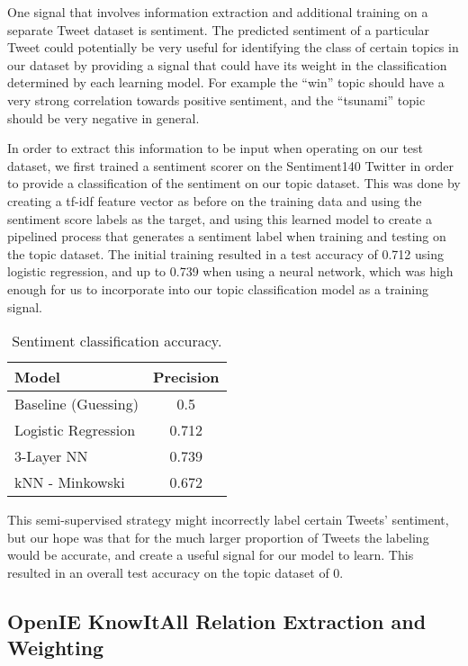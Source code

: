 \documentclass[11pt]{article}
\begin{document}
One signal that involves information extraction and additional training on a separate Tweet dataset is sentiment. The predicted sentiment of a particular Tweet could potentially be very useful for identifying the class of certain topics in our dataset by providing a signal that could have its weight in the classification determined by each learning model. For example the “win” topic should have a very strong correlation towards positive sentiment, and the “tsunami” topic should be very negative in general.

In order to extract this information to be input when operating on our test dataset, we first trained a sentiment scorer on the Sentiment140 Twitter in order to provide a classification of the sentiment on our topic dataset. This was done by creating a tf-idf feature vector as before on the training data and using the sentiment score labels as the target, and using this learned model to create a pipelined process that generates a sentiment label when training and testing on the topic dataset. The initial training resulted in a test accuracy of 0.712 using logistic regression, and up to 0.739 when using a neural network, which was high enough for us to incorporate into our topic classification model as a training signal.

\begin{table}[h]
\begin{center}
\begin{tabular}{|l|c|}
\hline \bf Model & \bf Precision \\ \hline
Baseline (Guessing) & 0.5 \\
Logistic Regression & 0.712 \\
3-Layer NN & 0.739 \\
kNN - Minkowski & 0.672 \\
\hline
\end{tabular}
\end{center}
\label{table:sentiment}
\caption{Sentiment classification accuracy.}
\end{table}

This semi-supervised strategy might incorrectly label certain Tweets’ sentiment, but our hope was that for the much larger proportion of Tweets the labeling would be accurate, and create a useful signal for our model to learn. This resulted in an overall test accuracy on the topic dataset of 0.

\subsection{OpenIE KnowItAll Relation Extraction and Weighting}
\end{document}
